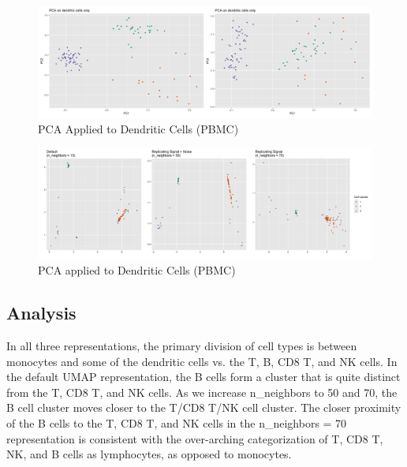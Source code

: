 \documentclass{article}
\begin{document}
\renewcommand{\thefigure}{17}
\begin{figure}[t]
\includegraphics[scale=0.22]{DC_PCA}
\centering
\caption{PCA Applied to Dendritic Cells (PBMC)}
\end{figure}

\renewcommand{\thefigure}{18}
\begin{figure}[b]
\includegraphics[scale=0.11]{DC_cluster}
\centering
\caption{PCA applied to Dendritic Cells (PBMC)}
\end{figure}

\subsection{Analysis}
In all three representations, the primary division of cell types is between monocytes and some of the dendritic cells vs. the T, B, CD8 T, and NK cells. In the default UMAP representation, the B cells form a cluster that is quite distinct from the T, CD8 T, and NK cells. As we increase n\_neighbors to 50 and 70, the B cell cluster moves closer to the T/CD8 T/NK cell cluster. The closer proximity of the B cells to the T, CD8 T, and NK cells in the n\_neighbors = 70 representation is consistent with the over-arching categorization of T, CD8 T, NK, and B cells as lymphocytes, as opposed to monocytes.
\end{document}

